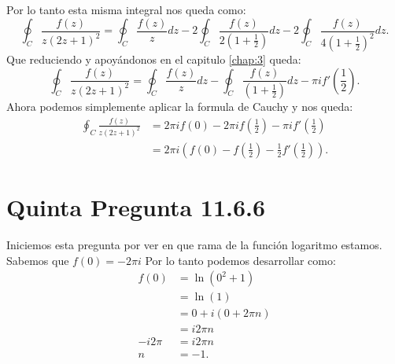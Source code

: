 \documentclass{report}
\begin{document}
Por lo tanto esta misma integral nos queda como: \[
    \oint_{C} \frac{f\left( z \right) }{z\left( 2z + 1 \right)^2} =
\oint_{C} \frac{f\left( z \right) }{z} dz - 2\oint_{C} \frac{f\left( z \right) }{2\left( 1 + \frac{1}{2} \right) }dz - 2 \oint_{C} \frac{f\left( z \right) }{4\left( 1 + \frac{1}{2} \right)^2} dz
.\] Que reduciendo y apoyándonos en el capitulo \ref{chap:3} queda: \[
    \oint_{C} \frac{f\left( z \right) }{z\left( 2z + 1 \right)^2} =
\oint_{C} \frac{f\left( z \right) }{z} dz - \oint_{C} \frac{f\left( z \right) }{\left( 1 + \frac{1}{2} \right) }dz - \pi i f'\left( \frac{1}{2} \right) 
.\] Ahora podemos simplemente aplicar la formula de Cauchy y nos queda:
\begin{align*}
  \oint_{C} \frac{f\left( z \right) }{z\left( 2z + 1 \right)^2} &= 2\pi i f\left( 0 \right) - 2\pi i f\left( \frac{1}{2} \right) - \pi i f'\left( \frac{1}{2} \right)  \\ 
  &= 2\pi i\left( f\left( 0 \right) - f\left( \frac{1}{2} \right) - \frac{1}{2}f'\left( \frac{1}{2} \right)  \right) 
.\end{align*}

\chapter{Quinta Pregunta 11.6.6}
\label{chap:6}


Iniciemos esta pregunta por ver en que rama de la función logaritmo estamos. Sabemos que $f\left( 0 \right) = -2\pi i $ Por lo tanto podemos desarrollar como:
\begin{align*}
  f\left( 0 \right) &= \ln\left( 0^2 + 1 \right)  \\
  &= \ln\left( 1 \right)  \\
  &= 0 + i \left( 0 + 2\pi n \right)  \\
  &= i 2\pi n  \\
  -i 2 \pi &= i 2\pi n \\
  n &= -1
.\end{align*}
\end{document}
